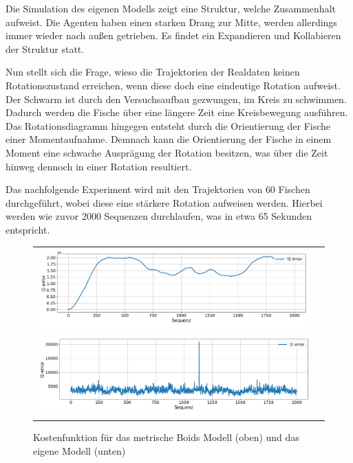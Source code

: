 Die Simulation des eigenen Modells zeigt eine Struktur, welche Zusammenhalt aufweist. Die Agenten haben einen starken Drang zur Mitte, werden allerdings immer wieder nach außen getrieben. Es findet ein Expandieren und Kollabieren der Struktur statt.


Nun stellt sich die Frage, wieso die Trajektorien der Realdaten keinen Rotationszustand erreichen, wenn diese doch eine eindeutige Rotation aufweist. Der Schwarm ist durch den Versuchsaufbau gezwungen, im Kreis zu schwimmen. Dadurch werden die Fische über eine längere Zeit eine Kreisbewegung ausführen. Das Rotationsdiagramm hingegen entsteht durch die Orientierung der Fische einer Momentaufnahme. Demnach kann die Orientierung der Fische in einem Moment eine schwache Ausprägung der Rotation besitzen, was über die Zeit hinweg dennoch in einer Rotation resultiert.

Das nachfolgende Experiment wird mit den Trajektorien von $60$ Fischen durchgeführt, wobei diese eine stärkere Rotation aufweisen werden. Hierbei werden wie zuvor 2000 Sequenzen durchlaufen, was in etwa 65 Sekunden entspricht.


\begin{figure}[H]
\centering
\begin{tabular}{cc}
\includegraphics[width=1.0\textwidth]{figures/Experimente/Realdaten/Boidsl2Fehler_60Fische.png} \\
\includegraphics[width=1.0\textwidth]{figures/Experimente/Realdaten/PWD2Fehler_60Fische.png}  
\end{tabular}
\caption{Kostenfunktion für das metrische Boids Modell (oben) und das eigene Modell (unten)\label{fig:60Fisch}}
\end{figure}

